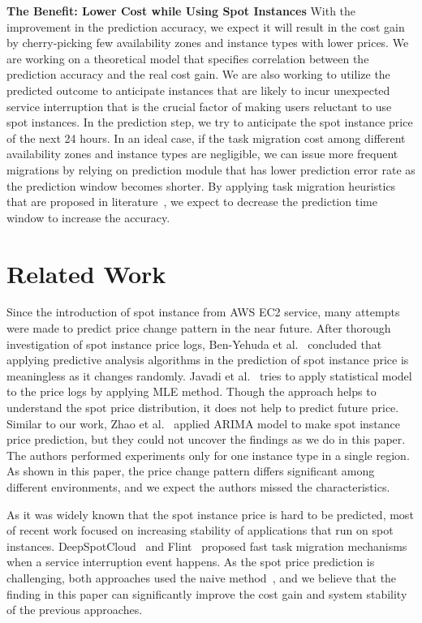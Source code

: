 \documentclass[graybox]{svmult}
\begin{document}
\textbf{The Benefit: Lower Cost while Using Spot Instances} With the improvement in the prediction accuracy, we expect it will result in the cost gain by cherry-picking few availability zones and instance types with lower prices. We are working on a theoretical model that specifies correlation between the prediction accuracy and the real cost gain. We are also working to utilize the predicted outcome to anticipate instances that are likely to incur unexpected service interruption that is the crucial factor of making users reluctant to use spot instances. In the prediction step, we try to anticipate the spot instance price of the next 24 hours. In an ideal case, if the task migration cost among different availability zones and instance types are negligible, we can issue more frequent migrations by relying on prediction module that has lower prediction error rate as the prediction window becomes shorter. By applying task migration heuristics that are proposed in literature~\cite{flint,deep-spot-cloud}, we expect to decrease the prediction time window to increase the accuracy.

\section{Related Work}
Since the introduction of spot instance from AWS EC2 service, many attempts were made to predict price change pattern in the near future.  
After thorough investigation of spot instance price logs, Ben-Yehuda et al.~\cite{spot-instance-pricing-analysis} concluded that applying predictive analysis algorithms in the prediction of spot instance price is meaningless as it changes randomly. Javadi et al.~\cite{availability-modeling} tries to apply statistical model to the price logs by applying MLE method. Though the approach helps to understand the spot price distribution, it does not help to predict future price. Similar to our work, Zhao et al.~\cite{spot-price-han-arima} applied ARIMA model to make spot instance price prediction, but they could not uncover the findings as we do in this paper. The authors performed experiments only for one instance type in a single region. As shown in this paper, the price change pattern differs significant among different environments, and we expect the authors missed the characteristics.

As it was widely known that the spot instance price is hard to be predicted, most of recent work focused on increasing stability of applications that run on spot instances. DeepSpotCloud~\cite{deep-spot-cloud} and Flint~\cite{flint} proposed fast task migration mechanisms when a service interruption event happens. As the spot price prediction is challenging, both approaches used the naive method~\cite{how-to-bid-cloud,not-bid-cloud}, and we believe that the finding in this paper can significantly improve the cost gain and system stability of the previous approaches.
\end{document}

